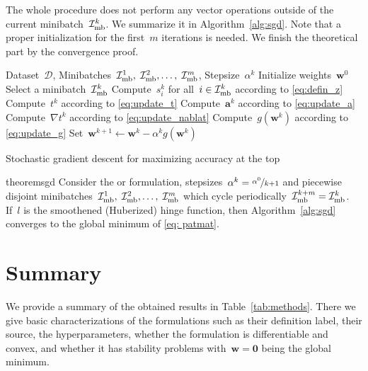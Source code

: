 The whole procedure does not perform any vector operations outside of the current minibatch~$\mathcal{I}_{\text{mb}}^k$. We summarize it in Algorithm~\ref{alg:sgd}. Note that a proper initialization for the first~$m$ iterations is needed. We finish the theoretical part by the convergence proof.

\begin{algorithm}
  \begin{algorithmic}[1]
    \Require Dataset~$\mathcal{D}$, Minibatches~$\mathcal{I}_{\text{mb}}^1,\; \mathcal{I}_{\text{mb}}^2, \ldots, \; \mathcal{I}_{\text{mb}}^m$, Stepsize~$\alpha^k$
    \State Initialize weights~$\bm{w}^0$
    \State Select a minibatch~$\mathcal{I}_{\text{mb}}^k$
    \State Compute~$s_i^k$ for all~$i \in \mathcal{I}_{\text{mb}}^k$ according to \eqref{eq:defin_z}
    \State Compute~$t^k$ according to \eqref{eq:update_t}
    \State Compute~$\bm{a}^k$ according to \eqref{eq:update_a}
    \State Compute~$\nabla t^k$ according to \eqref{eq:update_nablat}
    \State Compute~$g(\bm{w}^k)$ according to \eqref{eq:update_g}
    \State Set~$\bm{w}^{k+1} \gets \bm{w}^k - \alpha^k g(\bm{w}^k)$
    \EndFor
  \end{algorithmic}
  \caption{Stochastic gradient descent for maximizing accuracy at the top}
  \label{alg:sgd}
\end{algorithm}

\begin{restatable}{theorem}{sgd}\label{thm:sgd}
  Consider the \PatMat or \PatMatNP formulation, stepsizes~$\alpha^k = \nicefrac{\alpha^0}{k+1}$ and piecewise disjoint minibatches~$\mathcal{I}_{\text{mb}}^1, \; \mathcal{I}_{\text{mb}}^2, \ldots, \; \mathcal{I}_{\text{mb}}^m$ which cycle periodically~$\mathcal{I}_{\text{mb}}^{k+m} = \mathcal{I}_{\text{mb}}^k$. If~$l$ is the smoothened (Huberized) hinge function, then Algorithm~\ref{alg:sgd} converges to the global minimum of \eqref{eq: patmat}.
\end{restatable}

\section{Summary}

We provide a summary of the obtained results in Table~\ref{tab:methods}. There we give basic characterizations of the formulations such as their definition label, their source, the hyperparameters, whether the formulation is differentiable and convex, and whether it has stability problems with~$\bm{w}=\bm{0}$ being the global minimum. 

